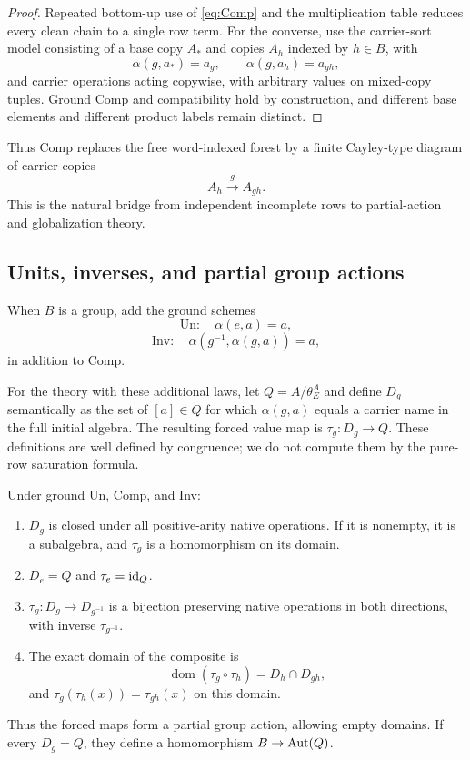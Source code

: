 \begin{proof}
Repeated bottom-up use of \eqref{eq:Comp} and the multiplication table reduces every clean chain to a single row term.  For the converse, use the carrier-sort model consisting of a base copy $A_*$ and copies $A_h$ indexed by $h\in B$, with
\[
\alpha(g,a_*)=a_g,
\qquad
\alpha(g,a_h)=a_{gh},
\]
and carrier operations acting copywise, with arbitrary values on mixed-copy tuples. Ground Comp and compatibility hold by construction, and different base elements and different product labels remain distinct.
\end{proof}

Thus Comp replaces the free word-indexed forest by a finite Cayley-type diagram of carrier copies
\[
A_h\xrightarrow{g}A_{gh}.
\]
This is the natural bridge from independent incomplete rows to partial-action and globalization theory.

\subsection{Units, inverses, and partial group actions}

When $B$ is a group, add the ground schemes
\[
\mathrm{Un}:\quad\alpha(e,a)=a,
\]
\[
\mathrm{Inv}:\quad\alpha(g^{-1},\alpha(g,a))=a,
\]
in addition to Comp.


For the theory with these additional laws, let $Q=A/\theta_E^A$ and define
$D_g$ semantically as the set of $[a]\in Q$ for which $\alpha(g,a)$ equals
a carrier name in the full initial algebra. The resulting forced value
map is $\tau_g:D_g\to Q$. These definitions are well defined by congruence;
we do not compute them by the pure-row saturation formula.

\begin{proposition}\label{prop:partialgroup}
Under ground Un, Comp, and Inv:
\begin{enumerate}[label=(\roman*)]
\item $D_g$ is closed under all positive-arity native operations. If it is
nonempty, it is a subalgebra, and $\tau_g$ is a homomorphism on its domain.
\item $D_e=Q$ and $\tau_e=\mathrm{id}_Q$.
\item $\tau_g:D_g\to D_{g^{-1}}$ is a bijection preserving native
operations in both directions, with inverse $\tau_{g^{-1}}$.
\item The exact domain of the composite is
\[
\operatorname{dom}(\tau_g\circ\tau_h)=D_h\cap D_{gh},
\]
and $\tau_g(\tau_h(x))=\tau_{gh}(x)$ on this domain.
\end{enumerate}
Thus the forced maps form a partial group action, allowing empty domains.
If every $D_g=Q$, they define a homomorphism $B\to\operatorname{Aut}(Q)$.
\end{proposition}

